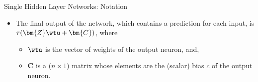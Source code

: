 \documentclass[11pt,compress,t,notes=noshow, xcolor=table]{beamer}
\begin{document}
\begin{vbframe}{Single Hidden Layer Networks: Notation}
\framebreak

  \begin{itemize}
    \vspace{15mm}
    \item The final output of the network, which contains a prediction for each input, is $\tau(\bm{Z}\wtu + \bm{C})$, where
      \begin{itemize}
        \vspace{2mm}
        \item $\wtu$ is the vector of weights of the output neuron, and,
        \vspace{2mm}
        \item $\bm{C}$ is a ($n \times 1$) matrix whose elements are the (scalar) bias $c$ of the output neuron.
      \end{itemize}
  \end{itemize}
\end{vbframe}
\endlecture
\end{document}
